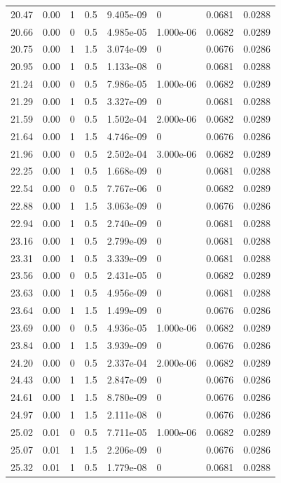 \documentclass[preview]{standalone}
\begin{document}
{{{\begin{tabular}{L{1.2cm}C{1.2cm} C{0.3cm}C{0.5cm} C{1.4cm}C{1.4cm} C{1.4cm}C{1.4cm}}
  20.47  &  0.00  & 1     & 0.5 &  9.405e-09  & 0  & 0.0681 &  0.0288   \\ 
  20.66  &  0.00  & 0     & 0.5 &  4.985e-05  & 1.000e-06  & 0.0682 &  0.0289   \\ 
  20.75  &  0.00  & 1     & 1.5 &  3.074e-09  & 0  & 0.0676 &  0.0286   \\ 
  20.95  &  0.00  & 1     & 0.5 &  1.133e-08  & 0  & 0.0681 &  0.0288   \\ 
  21.24  &  0.00  & 0     & 0.5 &  7.986e-05  & 1.000e-06  & 0.0682 &  0.0289   \\ 
  21.29  &  0.00  & 1     & 0.5 &  3.327e-09  & 0  & 0.0681 &  0.0288   \\ 
  21.59  &  0.00  & 0     & 0.5 &  1.502e-04  & 2.000e-06  & 0.0682 &  0.0289   \\ 
  21.64  &  0.00  & 1     & 1.5 &  4.746e-09  & 0  & 0.0676 &  0.0286   \\ 
  21.96  &  0.00  & 0     & 0.5 &  2.502e-04  & 3.000e-06  & 0.0682 &  0.0289   \\ 
  22.25  &  0.00  & 1     & 0.5 &  1.668e-09  & 0  & 0.0681 &  0.0288   \\ 
  22.54  &  0.00  & 0     & 0.5 &  7.767e-06  & 0  & 0.0682 &  0.0289   \\ 
  22.88  &  0.00  & 1     & 1.5 &  3.063e-09  & 0  & 0.0676 &  0.0286   \\ 
  22.94  &  0.00  & 1     & 0.5 &  2.740e-09  & 0  & 0.0681 &  0.0288   \\ 
  23.16  &  0.00  & 1     & 0.5 &  2.799e-09  & 0  & 0.0681 &  0.0288   \\ 
  23.31  &  0.00  & 1     & 0.5 &  3.339e-09  & 0  & 0.0681 &  0.0288   \\ 
  23.56  &  0.00  & 0     & 0.5 &  2.431e-05  & 0  & 0.0682 &  0.0289   \\ 
  23.63  &  0.00  & 1     & 0.5 &  4.956e-09  & 0  & 0.0681 &  0.0288   \\ 
  23.64  &  0.00  & 1     & 1.5 &  1.499e-09  & 0  & 0.0676 &  0.0286   \\ 
  23.69  &  0.00  & 0     & 0.5 &  4.936e-05  & 1.000e-06  & 0.0682 &  0.0289   \\ 
  23.84  &  0.00  & 1     & 1.5 &  3.939e-09  & 0  & 0.0676 &  0.0286   \\ 
  24.20  &  0.00  & 0     & 0.5 &  2.337e-04  & 2.000e-06  & 0.0682 &  0.0289   \\ 
  24.43  &  0.00  & 1     & 1.5 &  2.847e-09  & 0  & 0.0676 &  0.0286   \\ 
  24.61  &  0.00  & 1     & 1.5 &  8.780e-09  & 0  & 0.0676 &  0.0286   \\ 
  24.97  &  0.00  & 1     & 1.5 &  2.111e-08  & 0  & 0.0676 &  0.0286   \\ 
  25.02  &  0.01  & 0     & 0.5 &  7.711e-05  & 1.000e-06  & 0.0682 &  0.0289   \\ 
  25.07  &  0.01  & 1     & 1.5 &  2.206e-09  & 0  & 0.0676 &  0.0286   \\ 
  25.32  &  0.01  & 1     & 0.5 &  1.779e-08  & 0  & 0.0681 &  0.0288   \\ 
\hline 
\end{tabular} 

}}}
\end{document}
